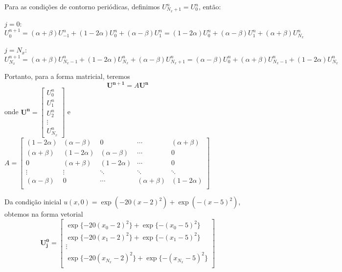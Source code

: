 \documentclass[12pt, a4paper]{article}
\renewcommand{\bf}[1]{\mathbf{#1}}
\begin{document}
    \newpage
    
    Para as condições de contorno periódicas, definimos $U_{N_x+1}^n = U_0^n$, então:

    $j = 0$:
    \[U_0^{n+1} = (\alpha+\beta)U_{-1}^n + (1-2\alpha)U_0^n + (\alpha-\beta)U_{1}^n = (1-2\alpha)U_0^n + (\alpha-\beta)U_{1}^n + (\alpha+\beta)U_{N_x}^n\]

    $j = N_x$:
    \[U_{N_x}^{n+1} = (\alpha+\beta)U_{N_x-1}^n + (1-2\alpha)U_{N_x}^n + (\alpha-\beta)U_{N_x+1}^n = (\alpha-\beta)U_{0}^n + (\alpha+\beta)U_{N_x-1}^n + (1-2\alpha)U_{N_x}^n\]

    Portanto, para a forma matricial, teremos
    \begin{equation}
        \bf{U^{n+1}} = A\bf{U^n}
    \end{equation}
    onde $\bf{U^n} = \begin{bmatrix}
        U_0^n \\ U_1^n \\ U_2^n \\ \vdots \\ U_{N_x}^n
    \end{bmatrix}$ e $A = \begin{bmatrix}
        (1-2\alpha) & (\alpha-\beta) & 0 & \cdots & (\alpha+\beta)\\
        (\alpha+\beta) & (1-2\alpha) & (\alpha-\beta) & \cdots & 0\\
        0 & (\alpha+\beta) & (1-2\alpha) & \cdots & 0\\
        \vdots & \vdots & \ddots & \ddots & \ddots\\
        (\alpha-\beta) & 0 & \cdots & (\alpha+\beta) & (1-2\alpha)\\
    \end{bmatrix}$

    Da condição inicial $u(x,0) = \exp(-20{(x-2)}^2)+\exp(-{(x-5)}^2)$, obtemos na forma vetorial
    \[\bf{U_j^0} = \begin{bmatrix}
        \exp\{-20{(x_0-2)}^2\}+\exp\{-{(x_0-5)}^2\}\\
        \exp\{-20{(x_1-2)}^2\}+\exp\{-{(x_1-5)}^2\}\\
        \vdots\\
        \exp\{-20{(x_{N_x}-2)}^2\}+\exp\{-{(x_{N_x}-5)}^2\}\\
    \end{bmatrix}\]
\end{document}
